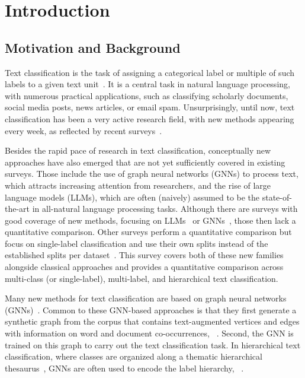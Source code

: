 \section{Introduction}

\subsection{Motivation and Background}

Text classification is the task of assigning a categorical label or multiple of such labels to a given text unit~\cite{DBLP:journals/csur/Sebastiani02,DBLP:journals/tkde/MoreoES20}. 
It is a central task in natural language processing, with numerous practical applications, such as classifying scholarly documents, social media posts, news articles, or email spam.
Unsurprisingly, until now, text classification has been a very active research field, with new methods appearing every week, as reflected by recent surveys~\cite{
DBLP:journals/tkde/HuLZHNL24,
fieldsSurveyTextClassification2024,
electronics13071199,
DBLP:journals/tist/LiPLXYSYH22,
DBLP:journals/csur/MinaeeKCNCG21,
DBLP:journals/corr/abs-2107-03158,
raihan2021-survey,
DBLP:journals/wias/ZhouGLVTBBK20, 
DBLP:journals/information/KowsariMHMBB19,
DBLP:journals/air/Kadhim19}. 

Besides the rapid pace of research in text classification, conceptually new approaches have also emerged that are not yet sufficiently covered in existing surveys. Those include the use of graph neural networks (GNNs) to process text, which attracts increasing attention from researchers, and the rise of large language models (LLMs), which are often (naively) assumed to be the state-of-the-art in all-natural language processing tasks. 
Although there are surveys with good coverage of new methods, \eg focusing on LLMs~\cite{DBLP:journals/tkde/HuLZHNL24} or GNNs~\cite{gnns-for-nlp-survey}, those then lack a quantitative comparison. 
Other surveys perform a quantitative comparison but focus on single-label classification and use their own splits instead of the established splits per dataset~\cite{DBLP:journals/eswa/ReusensSTSVBB24}.
This survey covers both of these new families alongside classical approaches and provides a quantitative comparison across multi-class (or single-label), multi-label, and hierarchical text classification.

Many new methods for text classification are based on graph neural networks (GNNs)~\cite{book:hamilton:grl}.
Common to these GNN-based approaches is that they first generate a synthetic graph from the corpus that contains text-augmented vertices and edges with information on word and document co-occurrences, \eg~\cite{DBLP:conf/aaai/YaoM019,texting_acl2020}. 
Second, the GNN is trained on this graph to carry out the text classification task.
In hierarchical text classification, where classes are organized along a thematic hierarchical thesaurus~\cite{DBLP:journals/csur/Sebastiani02}, GNNs are often used to encode the label hierarchy, \eg~\cite{hbgl,DBLP:conf/acl/WangWH0W22}.

